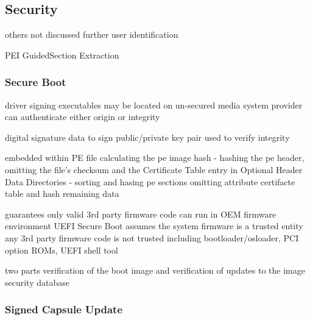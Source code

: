 
\subsection{Security}

others not discussed further
user identification

PEI
GuidedSection Extraction


\subsubsection{Secure Boot}

\cite{tianocore-understanding-uefi-secure-boot-chain}

driver signing
executables may be located on un-secured media
system provider can authenticate either origin or integrity

digital signature
data to sign
public/private key pair used to verify integrity


embedded within PE file
calculating the pe image hash
- hashing the pe header, omitting the file's checksum and the Certificate Table entry in Optional Header Data Directories
- sorting and hasing pe sections
omitting attribute certifacte table and hash remaining data

\cite{microsoft-pe-signature-format}




guarantees only valid 3rd party firmware code can run in OEM firmware environment
UEFI Secure Boot assumes the system firmware is a trusted entity
any 3rd party firmware code is not trusted
including bootloader/osloader, PCI option ROMs, UEFI shell tool

two parts
verification of the boot image and verification of updates to the image security database
\cite{understanding-uefi-secure-boot-chain}



\subsubsection{Signed Capsule Update}

